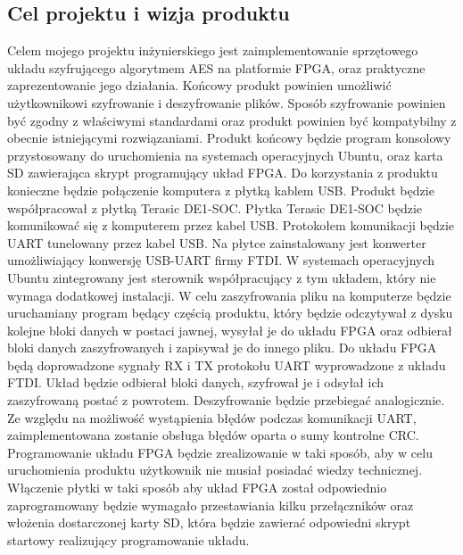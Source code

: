 \subsection{Cel projektu i wizja produktu}
Celem mojego projektu inżynierskiego jest zaimplementowanie sprzętowego układu szyfrującego algorytmem AES na platformie FPGA, oraz praktyczne zaprezentowanie jego działania. Końcowy produkt powinien umożliwić użytkownikowi szyfrowanie i deszyfrowanie plików. Sposób szyfrowanie powinien być zgodny z właściwymi standardami oraz produkt powinien być kompatybilny z obecnie istniejącymi rozwiązaniami.
\newline
Produkt końcowy będzie program konsolowy przystosowany do uruchomienia na systemach operacyjnych Ubuntu, oraz karta SD zawierająca skrypt programujący układ FPGA. Do korzystania z produktu konieczne będzie połączenie komputera z płytką kablem USB. Produkt będzie współpracował z płytką Terasic DE1-SOC.
\newline
Płytka Terasic DE1-SOC będzie komunikować się z komputerem przez kabel USB. Protokołem komunikacji będzie UART tunelowany przez kabel USB. Na płytce zainstalowany jest konwerter umożliwiający konwersję USB-UART firmy FTDI. W systemach operacyjnych Ubuntu zintegrowany jest sterownik współpracujący z tym układem, który nie wymaga dodatkowej instalacji.
\newline
W celu zaszyfrowania pliku na komputerze będzie uruchamiany program będący częścią produktu, który będzie odczytywał z dysku kolejne bloki danych w postaci jawnej, wysyłał je do układu FPGA oraz odbierał bloki danych zaszyfrowanych i zapisywał je do innego pliku. Do układu FPGA będą doprowadzone sygnały RX i TX protokołu UART wyprowadzone z układu FTDI. Układ będzie odbierał bloki danych, szyfrował je i odsyłał ich zaszyfrowaną postać z powrotem. Deszyfrowanie będzie przebiegać analogicznie. Ze względu na możliwość wystąpienia błędów podczas komunikacji UART, zaimplementowana zostanie obsługa błędów oparta o sumy kontrolne CRC.
\newline
Programowanie układu FPGA będzie zrealizowanie w taki sposób, aby w celu uruchomienia produktu użytkownik nie musiał posiadać wiedzy technicznej. Włączenie płytki w taki sposób aby układ FPGA został odpowiednio zaprogramowany będzie wymagało przestawiania kilku przełączników oraz włożenia dostarczonej karty SD, która będzie zawierać odpowiedni skrypt startowy realizujący programowanie układu.

\newpage